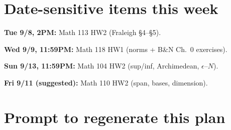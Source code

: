 \documentclass[11pt]{article}
\begin{document}
\section*{Date-sensitive items this week}
\begin{todo}
  \item \textbf{Tue 9/8, 2PM:} Math 113 HW2 (Fraleigh \S4--\S5).
  \item \textbf{Wed 9/9, 11:59PM:} Math 118 HW1 (norms + B\&N Ch.~0 exercises).
  \item \textbf{Sun 9/13, 11:59PM:} Math 104 HW2 (sup/inf, Archimedean,
    $\epsilon$--$N$).
  \item \textbf{Fri 9/11 (suggested):} Math 110 HW2 (span, bases, dimension).
\end{todo}

\appendix
\section*{Prompt to regenerate this plan}
\end{document}
